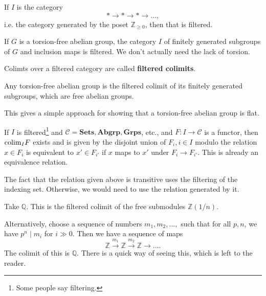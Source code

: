 \begin{example} 
If $I$ is the category
\[ \ast \to \ast \to \ast \to \dots,  \]
i.e. the category generated by the poset $\mathbb{Z}_{\geq 0}$, then that is
filtered.
\end{example} 


\begin{example} 
If $G$ is a torsion-free abelian group, the category $I$ of finitely generated
subgroups of $G$ and inclusion maps is filtered. We don't actually need the
lack of torsion. 
\end{example} 

\begin{definition} 
Colimts over a filtered category are called \textbf{filtered colimits}.
\end{definition} 

\begin{example} 
Any torsion-free abelian group is the filtered colimit of its finitely
generated subgroups, which are free abelian groups.  
\end{example} 
This gives a simple approach for showing that a torsion-free abelian group is
flat.

\begin{proposition} 
If $I$ is filtered\footnote{Some people say filtering.} and $\mathcal{C} =
\mathbf{Sets}, \mathbf{Abgrp}, \mathbf{Grps}$, etc., and $F: I \to \mathcal{C}$
is a functor, then $\mathrm{colim}_I F$ exists and is given by the disjoint union of
$F_i, i \in I$ modulo the relation $x \in F_i$ is equivalent to $x' \in F_{i'}$
if $x$ maps to $x'$ under $F_i \to F_{i'}$. This is already an equivalence
relation. 
\end{proposition} 

The fact that the relation given above is transitive uses the filtering of the
indexing set. Otherwise, we would need to use the relation generated by it. 

\begin{example} 
Take $\mathbb{Q}$. This is the filtered colimit of the free submodules
$\mathbb{Z}(1/n)$.

Alternatively, choose a sequence of numbers $m_1 , m_2, \dots, $ such that for
all $p, n$, we have $p^n \mid m_i$ for $i \gg 0$. Then we have a sequence of
maps
\[ \mathbb{Z} \stackrel{m_1}{\to} \mathbb{Z} \stackrel{m_2}{\to}\mathbb{Z}
\to \dots.   \]
The colimit of this is $\mathbb{Q}$. There is a quick way of seeing this, which
is left to the reader.
\end{example} 

